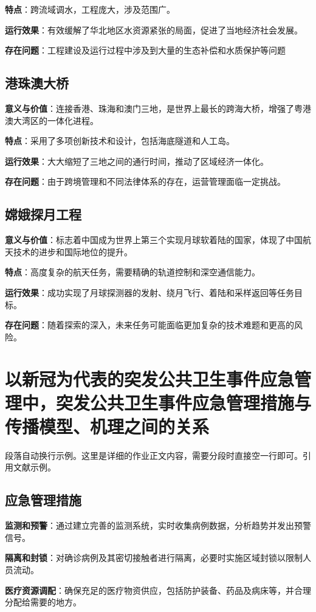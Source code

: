 \documentclass[UTF8,a4paper]{ctexart}
\begin{document}
	\textbf{特点}：跨流域调水，工程庞大，涉及范围广。
	
	\textbf{运行效果}：有效缓解了华北地区水资源紧张的局面，促进了当地经济社会发展。
	
	\textbf{存在问题}：工程建设及运行过程中涉及到大量的生态补偿和水质保护等问题
	
	\subsection{港珠澳大桥}
	\textbf{意义与价值}：连接香港、珠海和澳门三地，是世界上最长的跨海大桥，增强了粤港澳大湾区的一体化进程。
	
	\textbf{特点}：采用了多项创新技术和设计，包括海底隧道和人工岛。
	
	\textbf{运行效果}：大大缩短了三地之间的通行时间，推动了区域经济一体化。
	
	\textbf{存在问题}：由于跨境管理和不同法律体系的存在，运营管理面临一定挑战。
	
	\subsection{嫦娥探月工程}
	\textbf{意义与价值}：标志着中国成为世界上第三个实现月球软着陆的国家，体现了中国航天技术的进步和国际地位的提升。
	
	\textbf{特点}：高度复杂的航天任务，需要精确的轨道控制和深空通信能力。
	
	\textbf{运行效果}：成功实现了月球探测器的发射、绕月飞行、着陆和采样返回等任务目标。
	
	\textbf{存在问题}：随着探索的深入，未来任务可能面临更加复杂的技术难题和更高的风险。
	\newpage

	\section{以新冠为代表的突发公共卫生事件应急管理中，突发公共卫生事件应急管理措施与传播模型、机理之间的关系}
	段落自动换行示例。这里是详细的作业正文内容，需要分段时直接空一行即可。引用文献示例。
	
	\subsection{应急管理措施}
	\textbf{监测和预警}：通过建立完善的监测系统，实时收集病例数据，分析趋势并发出预警信号。
	
	\textbf{隔离和封锁}：对确诊病例及其密切接触者进行隔离，必要时实施区域封锁以限制人员流动。
	
	\textbf{医疗资源调配}：确保充足的医疗物资供应，包括防护装备、药品及病床等，并合理分配给需要的地方。
	
\end{document}
